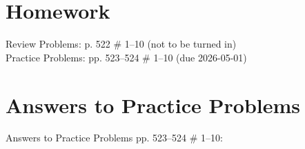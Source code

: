 \documentclass[11pt, oneside]{article}   	%
\begin{document}
\section{Homework}
Review Problems: p. 522 \# 1--10 (not to be turned in)\\
Practice Problems: pp. 523--524 \# 1--10 (due 2026-05-01)\\
 
\nocite{feynman-entropy-lecture-video} 
\nocite{reading-feynman-entropy}
\nocite{chem:libretexts:energy-diagrams}
\nocite{wile-chem-2}
%
%

\printbibliography

\clearpage
\section*{Answers to Practice Problems}
Answers to Practice Problems pp. 523--524 \# 1--10:
\end{document}
